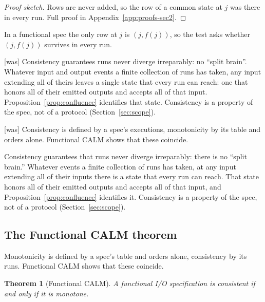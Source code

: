 \documentclass[sigconf]{cidr-2027}
\newtheorem{theorem}{Theorem}
\theoremstyle{remark}
\newcommand{\inrelpart}{extending\xspace}    %
\newcommand{\spectype}[1][]{I/O specification#1\xspace}
\begin{document}
\begin{proof}[Proof sketch]
Rows are never added, so the row of a common state at $j$ was there
in every run.  Full proof in Appendix~\ref{app:proofs-sec2}.
\end{proof}

In a functional spec the only row at $j$ is $(j,f(j))$, so the test
asks whether $(j,f(j))$ survives in every run.



{\footnotesize\color{black!50}\noindent\textsf{[was]} Consistency guarantees runs never diverge irreparably: no ``split brain''.  Whatever input
and output events a finite collection of runs has taken, any input \inrelpart all
of theirs leaves a single state that every run can reach: one that honors all
of their emitted outputs and accepts all of that input.
Proposition~\ref{prop:confluence} identifies that state.  Consistency is a
property of the spec, not of a protocol (Section~\ref{sec:scope}).\par}



{\footnotesize\color{black!50}\noindent\textsf{[was]} Consistency is defined by a spec's executions, monotonicity by its
table and orders alone.  Functional CALM shows that these coincide.\par}

\color{blue!70!black}Consistency guarantees that runs never diverge irreparably: there is no
``split brain.''  Whatever events a finite collection of runs has taken, at any
input \inrelpart all of their inputs there is a state that every run can reach.
That state honors all of their emitted outputs and accepts all of that input,
and Proposition~\ref{prop:confluence} identifies it.  Consistency is a
property of the spec, not of a protocol (Section~\ref{sec:scope}).\color{black}

\subsection{The Functional CALM theorem}
\label{sec:functional-calm-theorem}

\color{blue!70!black}Monotonicity is defined by a spec's table and orders alone, consistency by its
runs.  Functional CALM shows that these coincide.\color{black}

\begin{theorem}[Functional CALM]
\label{thm:functional-calm}
A functional \spectype is consistent if and only if it is
monotone.
\end{theorem}
\end{document}
